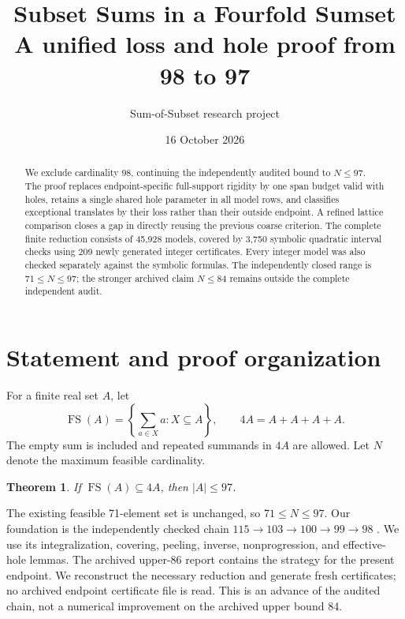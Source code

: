 \documentclass[11pt,a4paper]{article}
\title{Subset Sums in a Fourfold Sumset\\\large A unified loss and hole proof from 98 to 97}
\author{Sum-of-Subset research project}
\date{16 October 2026}
\newcommand{\FS}{\operatorname{FS}}
\newtheorem{theorem}{Theorem}[section]
\begin{document}
\maketitle
\begin{abstract}
We exclude cardinality 98, continuing the independently audited bound to
$N\le97$. The proof replaces endpoint-specific full-support rigidity by
one span budget valid with holes, retains a single shared hole parameter
in all model rows, and classifies exceptional translates by their loss
rather than their outside endpoint. A refined lattice comparison closes
a gap in directly reusing the previous coarse criterion. The complete
finite reduction consists of 45,928 models, covered by 3,750 symbolic
quadratic interval checks using 209 newly generated integer certificates.
Every integer model was also checked separately against the symbolic
formulas. The independently closed range is $71\le N\le97$; the stronger
archived claim $N\le84$ remains outside the complete independent audit.
\end{abstract}
\tableofcontents

\section{Statement and proof organization}
For a finite real set $A$, let
\[
 \FS(A)=\left\{\sum_{a\in X}a:X\subseteq A\right\},\qquad
 4A=A+A+A+A.
\]
The empty sum is included and repeated summands in $4A$ are allowed.
Let $N$ denote the maximum feasible cardinality.
\begin{theorem}\label{thm:main}
If $\FS(A)\subseteq4A$, then $|A|\le97$.
\end{theorem}
The existing feasible 71-element set is unchanged, so $71\le N\le97$.
Our foundation is the independently checked chain
$115\to103\to100\to99\to98$ \cite{base103,base100,base99,base98}.
We use its integralization, covering, peeling, inverse, nonprogression,
and effective-hole lemmas. The archived upper-86 report \cite{archive}
contains the strategy for the present endpoint. We reconstruct the
necessary reduction and generate fresh certificates; no archived endpoint
certificate file is read. This is an advance of the audited chain, not a
numerical improvement on the archived upper bound 84.
\end{document}
